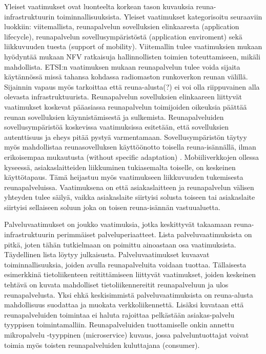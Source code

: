 \documentclass[finnish]{tktltiki2}
\theoremstyle{definition}
\theoremstyle{remark}
\begin{document}
Yleiset vaatimukset ovat luonteelta korkean tason kuvauksia reuna-infrastruktuurin toiminnallisuuksista. Yleiset vaatimukset kategorisoitu seuraaviin luokkiin: viitemallista, reunapalvelun sovelluksien elinkaaresta (application lifecycle),
reunapalvelun sovellusympäristöstä (application enviroment) sekä liikkuvuuden tuesta (support of mobility).
Viitemallin tulee vaatimuksien mukaan hyödyntää mukaan NFV ratkaisuja hallinnollisten toimien toteuttamiseen, mikäli mahdollista. 
ETSI:n vaatimuksen mukaan reunapalvelun tulee voida sijaita käytännössä missä tahansa kohdassa radiomaston runkoverkon reunan välillä. Sijainnin vapaus myös tarkoittaa että reuna-alusta(?) ei voi olla riippuvainen alla olevasta infrastruktuurista. 
Reunapalvelun sovelluksien elinkaareen liittyvät vaatimukset koskevat pääasiassa reunapalvelun toimijoiden oikeuksia päättää reunan sovelluksien käynnistämisestä ja sulkemista.
Reunapalveluiden sovellusympäristöä koskevissa vaatimuksissa esitetään, että sovelluksien autenttisuus ja eheys pitää pystyä varmentamaan. Sovellusympäristön täytyy myös mahdollistaa reunasovelluksen käyttöönotto toisella reuna-isännällä, ilman erikoisempaa mukautusta (without specific adaptation) \cite{etsitechreq}.
Mobiiliverkkojen ollessa kyseessä, asiakaslaitteiden liikkuminen tukiasemalta toiselle, on keskeinen käyttötapaus. Tämä heijastuu myös vaatimukseen liikkuvuuden tukemisesta reunapalveluissa.
Vaatimuksena on että asiakaslaitteen ja reunapalvelun välisen yhteyden tulee säilyä, vaikka asiakaslaite siirtyisi solusta toiseen tai asiakaslaite siirtyisi sellaiseen soluun joka on toisen reuna-isännän vastuualuetta.

Palveluvaatimukset on joukko vaatimuksia, jotka keskittyvät takaamaan reuna-infrastruktuurin perimmäiset palveluperiaatteet.
Lista palveluvaatimuksista on pitkä, joten tähän tutkielmaan on poimittu ainoastaan osa vaatimuksista. Täydellinen lista löytyy \cite{etsitechreq} julkaisusta.
Palveluvaatimukset kuvaavat toiminnallisuuksia, joiden avulla reunapalveluita voidaan tuottaa. Tällaisesta esimerkkinä tietoliikenteen reitittämiseen liittyvät vaatimukset, joiden keskeinen tehtävä on kuvata mahdolliset tietoliikennereitit reunapalveluun ja ulos reunapalvelusta. Yksi ehkä keskisimmistä palveluvaatimuksista on reuna-alusta mahdollisuus suodattaa ja muokata verkkoliikennettä. 
Lisäksi kuvataan että reunapalveluiden toimintaa ei haluta rajoittaa pelkästään asiakas-palvelu tyyppisen toimintamalliin. Reunapalveluiden tuottamiselle onkin annettu mikropalvelu -tyyppinen (microservice) kuvaus, jossa palveluntuottajat voivat toimia myös toisten reunapalveluiden kuluttajana (consumer).
\end{document}
